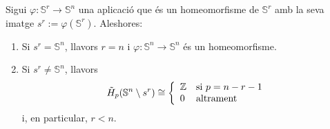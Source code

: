 \documentclass[../main.tex]{subfiles}
\begin{document}
\begin{ter}
[Separació]\label{ter:separaciojordanbrouwer} Sigui $\varphi:\mathbb{S}^r\rightarrow\mathbb{S}^n$ una aplicació que és un homeomorfisme de $\mathbb{S}^r$ amb la seva imatge $s^r:=\varphi(\mathbb{S}^r)$. Aleshores:
\begin{enumerate}
    \item Si $s^r = \mathbb{S}^n$, llavors $r = n$ i $\varphi:\mathbb{S}^n\rightarrow\mathbb{S}^n$ és un homeomorfisme.
    \item Si $s^r\not=\mathbb{S}^n$, llavors
    \begin{equation}
        \notag
        \Tilde{H}_p(\mathbb{S}^n\setminus s^r)\cong\left\{
        \begin{array}{ll}
            \mathbb{Z} & \text{si $p=n-r-1$} \\
            0 & \text{altrament}
        \end{array}
        \right.
    \end{equation}
    i, en particular, $r<n$.
\end{enumerate}
\end{ter}
\end{document}
